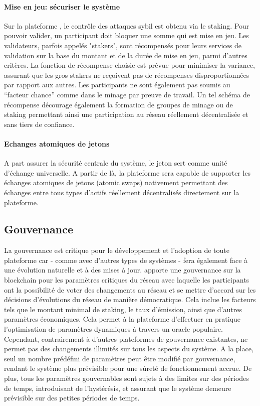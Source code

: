 \documentclass[runningheads]{llncs}
\begin{document}
\paragraph{Mise en jeu: sécuriser le système}
Sur la plateforme \AVAPlatformName{}, le contrôle des attaques sybil est obtenu via le staking. Pour pouvoir valider, un
participant doit bloquer une somme qui est mise en jeu. Les validateurs, parfois appelés "stakers", sont récompensés
pour leurs services de validation sur la base du montant et de la durée de mise en jeu, parmi d'autres critères. La
fonction de récompense choisie est prévue pour minimiser la variance, assurant que les gros stakers ne reçoivent pas de
récompenses disproportionnées par rapport aux autres. Les participants ne sont également pas soumis au
``facteur chance'' comme dans le minage par preuve de travail. Un tel schéma de récompense décourage également la
formation de groupes de minage ou de staking permettant ainsi une participation au réseau réellement décentralisée et
sans tiers de confiance.

\paragraph{Echanges atomiques de jetons}
A part assurer la sécurité centrale du système, le jeton \AVATokenName{} sert comme unité d'échange universelle. A
partir de là, la plateforme \AVAPlatformName{} sera capable de supporter les échanges atomiques de jetons (atomic swaps)
nativement permettant des échanges entre tous types d'actifs réellement décentralisés directement sur la plateforme.

\subsection{Gouvernance}
La gouvernance est critique pour le développement et l'adoption de toute plateforme car - comme avec d'autres types de
systèmes - \AVAPlatformName{} fera également face à une évolution naturelle et à des mises à jour. \AVATokenName{}
apporte une gouvernance sur la blockchain pour les paramètres critiques du réseau avec laquelle les participants ont la
possibilité de voter des changements au réseau et se mettre d'accord sur les décisions d'évolutions du réseau de manière
démocratique. Cela inclue les facteurs tels que le montant minimal de staking, le taux d'émission, ainsi que d'autres
paramètres économiques. Cela permet à la plateforme d'effectuer en pratique l'optimisation de paramètres dynamiques à
travers un oracle populaire. Cependant, contrairement à d'autres plateformes de gouvernance existantes,
\AVAPlatformName{} ne permet pas des changements illimités sur tous les aspects du système. A la place, seul un nombre
prédéfini de paramètres peut être modifié par gouvernance, rendant le système plus prévisible pour une sûreté de
fonctionnement accrue. De plus, tous les paramètres gouvernables sont sujets à des limites sur des périodes de temps,
introduisant de l'hystérésis, et assurant que le système demeure prévisible sur des petites périodes de temps.
\end{document}
